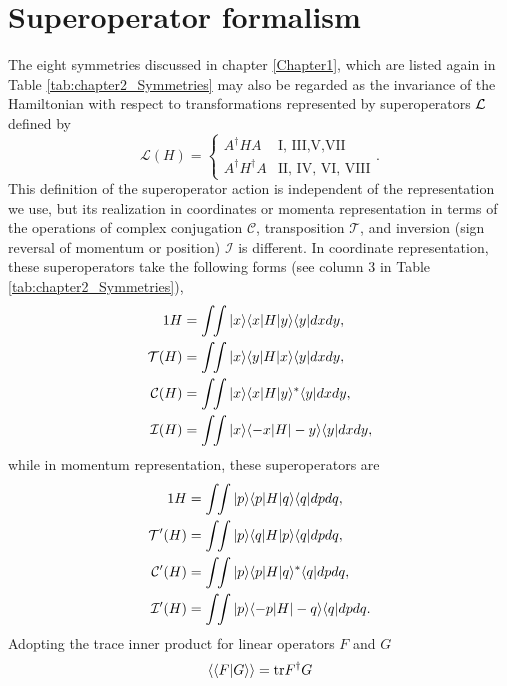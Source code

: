 \section{Superoperator formalism\label{sec:chapter2_super}}

The eight symmetries discussed in chapter \ref{Chapter1}, which are listed again in Table \ref{tab:chapter2_Symmetries} may also be regarded as the invariance of the Hamiltonian with respect to
transformations represented by superoperators ${\cal L}$ \cite{Simon2018} defined by
%
\begin{equation}
	\mathcal{L}(H)=
	\begin{cases}
		A^\dagger H A &  \text{I, III,V,VII} \\
		A^\dagger H^\dagger A &\text{II, IV, VI, VIII}
		\end{cases}.
\end{equation}
%
This definition of the superoperator action is independent of the representation we use, but its realization in coordinates or momenta representation in terms of the operations of complex conjugation $\mathcal{C}$, transposition $\mathcal{T}$, and inversion (sign reversal of momentum or position) $\mathcal{I}$ is different. In coordinate representation, these superoperators take the following forms (see column 3 in Table \ref{tab:chapter2_Symmetries}),
%
\begin{align}
	1 H&=\int\!\!\int |x\ra \la x|H|y\ra\la y| dx dy,
	\nonumber\\
	{\cal T} (H) &=\int\!\!\int |x\ra \la y|H|x\ra\la y| dx dy,
	\nonumber\\
	{\cal C} (H)&=\int\!\!\int |x\ra \la x|H|y\ra^*\la y| dx dy,
	\nonumber\\
	{\cal I} (H)&=\int\!\!\int |x\ra \la -x|H|-y\ra\la y| dx dy,
	\label{eq:chapter2_superoperatorsPosition}
\end{align}
%
while in momentum representation, these superoperators are
%
\begin{align}
	1 H&=\int\!\!\int |p\ra \la p|H|q\ra\la q| dp dq,
	\nonumber\\
	{\cal T}' (H) &=\int\!\!\int |p\ra \la q|H|p\ra\la q| dp dq,
	\nonumber\\
	{\cal C}' (H)&=\int\!\!\int |p\ra \la p|H|q\ra^*\la q| dp dq,
	\nonumber\\
	{\cal I}' (H)&=\int\!\!\int |p\ra \la -p|H|-q\ra\la q| dp dq.
	\label{eq:chapter2_superoperatorsMomentum}
\end{align}
%
Adopting the trace inner product for linear operators $F$ and $G$
%
\begin{equation}
  \langle\langle F|G\rangle\rangle={\rm{tr}} F^\dagger G
  \label{eq:chapter1_innerProduct}
\end{equation}
